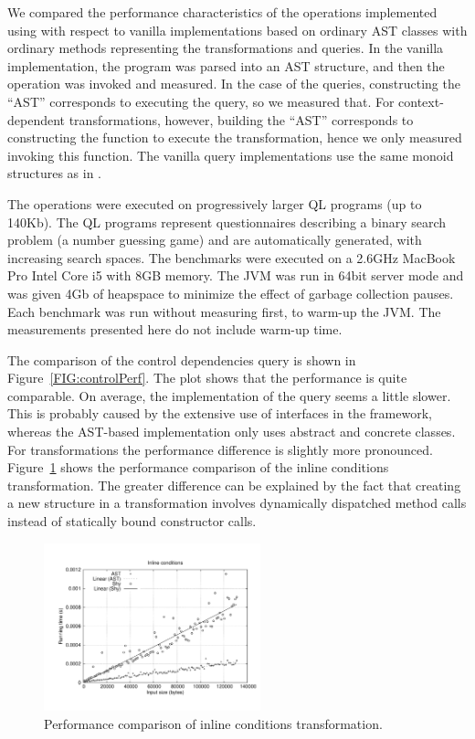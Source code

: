 We compared the performance characteristics of the operations implemented using \name with respect to vanilla implementations based on ordinary AST classes with ordinary methods representing the transformations and queries.
In the vanilla implementation, the program was parsed into an AST structure, and then the operation was invoked and measured.
In the case of the \name queries, constructing the ``AST'' corresponds to executing the query, so we measured that.
For context-dependent transformations, however, building the ``AST'' corresponds to constructing the function to execute the transformation, hence we only measured invoking this function.
The vanilla query implementations use the same monoid structures as in \name.

The operations were executed on progressively larger QL programs (up to 140Kb). The QL programs represent questionnaires describing a binary search problem (a number guessing game) and are automatically generated, with increasing search spaces. The benchmarks were executed on a 2.6GHz MacBook Pro Intel Core i5 with 8GB memory. The JVM was run in 64bit server mode and was given 4Gb of heapspace to minimize the effect of garbage collection pauses. Each benchmark was run without measuring first,  to warm-up the JVM. The measurements presented here do not include warm-up time.

The comparison of the control dependencies query is shown in Figure~\ref{FIG:controlPerf}.
The plot shows that the performance is quite comparable.
On average, the \name implementation of the query seems a little slower.
This is probably caused by the extensive use of interfaces in the \name framework, whereas the AST-based implementation only uses abstract and concrete classes.
For transformations the performance difference is slightly more pronounced.
Figure~\ref{FIG:inlinePerf} shows the performance comparison of the inline conditions transformation.
The greater difference can be explained by the fact that creating a new structure in a \name transformation involves dynamically dispatched method calls instead of statically bound constructor calls.

\begin{figure}[t]
  \nocaptionrule
  \hspace*{-.05\textwidth}
  \includegraphics[width=0.56\textwidth]{plots/inline}
  \caption{Performance comparison of inline conditions transformation.\label{FIG:inlinePerf}}
\end{figure}

